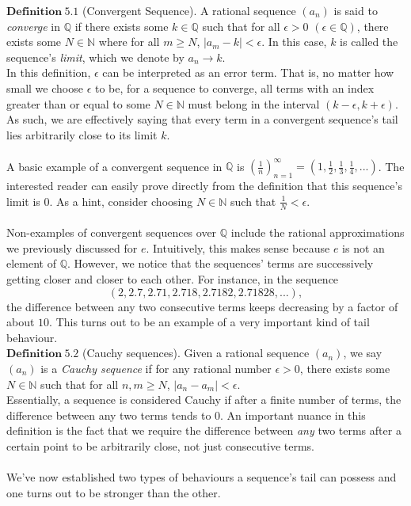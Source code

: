 \documentclass[12pt]{article}
\theoremstyle{definition}
\theoremstyle{remark}
\begin{document}
\noindent $\mathbf{Definition\ 5.1}$ (Convergent Sequence)\cite[pg.693-694]{calc}.
        A rational sequence $(a_n)$ is said to \textit{converge} in $\mathbb{Q}$ if there exists some $k\in\mathbb{Q}$ such that for all $\epsilon >0$ $(\epsilon\in\mathbb{Q})$, there exists some $N\in\mathbb{N}$ where for all $m\geq N$, $|a_m-k|<\epsilon$. In this case, $k$ is called the sequence's \textit{limit}, which we denote by $a_n\rightarrow k$.\\

 \noindent In this definition, $\epsilon$ can be interpreted as an error term. That is, no matter how small we choose $\epsilon$ to be, for a sequence to converge, all terms with an index greater than or equal to some $N\in\mathbb{N}$ must belong in the interval $(k-\epsilon, k+\epsilon)$. As such, we are effectively saying that every term in a convergent sequence's tail lies arbitrarily close to its limit $k$.\\\\
 A basic example of a convergent sequence in $\mathbb{Q}$ is $(\frac{1}{n})_{n=1}^\infty=(1, \frac{1}{2}, \frac{1}{3}, \frac{1}{4},...)$. The interested reader can easily prove directly from the definition that this sequence's limit is $0$. As a hint, consider choosing $N\in\mathbb{N}$ such that $\frac{1}{N}<\epsilon$.\\\\
 Non-examples of convergent sequences over $\mathbb{Q}$ include the rational approximations we previously discussed for $e$. Intuitively, this makes sense because $e$ is not an element of $\mathbb{Q}$. However, we notice that the sequences' terms are successively getting closer and closer to each other. For instance, in the sequence
 $$(2,2.7,2.71,2.718,2.7182,2.71828,...),$$
 the difference between any two consecutive terms keeps decreasing by a factor of about $10$. This turns out to be an example of a very important kind of tail behaviour.\\
 
\noindent $\mathbf{Definition\ 5.2}$ (Cauchy sequences)\cite[pg.56]{new}.
        Given a rational sequence $(a_n)$, we say $(a_n)$ is a \textit{Cauchy sequence} if for any rational number $\epsilon>0$, there exists some $N\in\mathbb{N}$ such that for all $n,m\geq N$, $|a_n-a_m|<\epsilon$.\\
 
\noindent Essentially, a sequence is considered Cauchy if after a finite number of terms, the difference between any two terms tends to $0$. An important nuance in this definition is the fact that we require the difference between \textit{any} two terms after a certain point to be arbitrarily close, not just consecutive terms.\\\\
We've now established two types of behaviours a sequence's tail can possess and one turns out to be stronger than the other.\\
\end{document}

